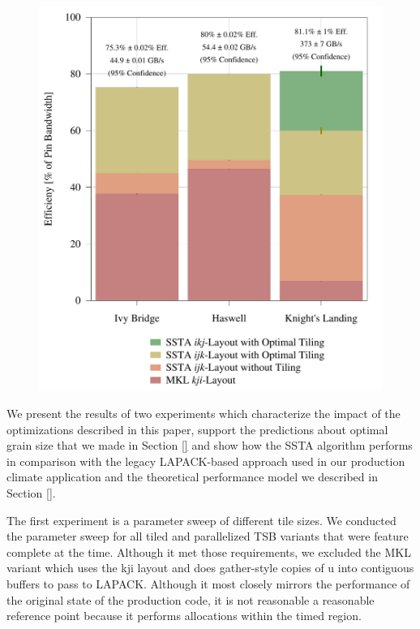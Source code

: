 \documentclass{sig-alternate-05-2015}
\begin{document}
\begin{figure}[!bth]
\begin{minipage}{0.49\textwidth}
    \includegraphics[width=0.95\columnwidth]{figures/post_tsb_impact_of_optimizations_histogram_09_03_2016_09_04_2016_1socket.pdf}
  \end{minipage}
\end{figure}

We present the results of two experiments which characterize the impact of the
optimizations described in this paper, support the predictions about optimal
grain size that we made in Section \ref{} and show how the SSTA algorithm
performs in comparison with the legacy LAPACK-based approach used in our
production climate application and the theoretical performance model we
described in Section \ref{}.

The first experiment is a parameter sweep of different tile sizes. We conducted
the parameter sweep for all tiled and parallelized TSB variants that were
feature complete at the time. Although it met those requirements, we excluded
the MKL variant which uses the kji layout and does gather-style copies of u
into contiguous buffers to pass to LAPACK. Although it most closely mirrors the
performance of the original state of the production code, it is not reasonable
a reasonable reference point because it performs allocations within the timed 
region.
\end{document}
